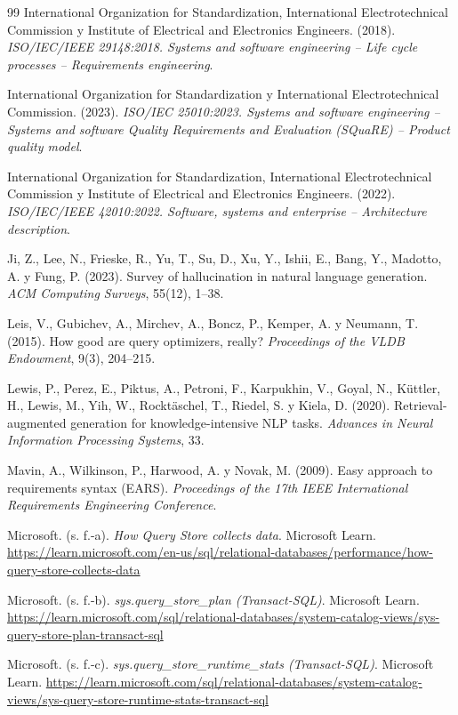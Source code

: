 \documentclass[12pt,a4paper]{article}
\begin{document}
\begin{thebibliography}{99}
 International Organization for Standardization, International Electrotechnical Commission y Institute of Electrical and Electronics Engineers. (2018). \textit{ISO/IEC/IEEE 29148:2018. Systems and software engineering -- Life cycle processes -- Requirements engineering}.

 International Organization for Standardization y International Electrotechnical Commission. (2023). \textit{ISO/IEC 25010:2023. Systems and software engineering -- Systems and software Quality Requirements and Evaluation (SQuaRE) -- Product quality model}.

 International Organization for Standardization, International Electrotechnical Commission y Institute of Electrical and Electronics Engineers. (2022). \textit{ISO/IEC/IEEE 42010:2022. Software, systems and enterprise -- Architecture description}.

 Ji, Z., Lee, N., Frieske, R., Yu, T., Su, D., Xu, Y., Ishii, E., Bang, Y., Madotto, A. y Fung, P. (2023). Survey of hallucination in natural language generation. \textit{ACM Computing Surveys}, 55(12), 1--38.

 Leis, V., Gubichev, A., Mirchev, A., Boncz, P., Kemper, A. y Neumann, T. (2015). How good are query optimizers, really? \textit{Proceedings of the VLDB Endowment}, 9(3), 204--215.

 Lewis, P., Perez, E., Piktus, A., Petroni, F., Karpukhin, V., Goyal, N., Küttler, H., Lewis, M., Yih, W., Rocktäschel, T., Riedel, S. y Kiela, D. (2020). Retrieval-augmented generation for knowledge-intensive NLP tasks. \textit{Advances in Neural Information Processing Systems}, 33.

 Mavin, A., Wilkinson, P., Harwood, A. y Novak, M. (2009). Easy approach to requirements syntax (EARS). \textit{Proceedings of the 17th IEEE International Requirements Engineering Conference}.

 Microsoft. (s. f.-a). \textit{How Query Store collects data}. Microsoft Learn. \url{https://learn.microsoft.com/en-us/sql/relational-databases/performance/how-query-store-collects-data}

 Microsoft. (s. f.-b). \textit{sys.query\_store\_plan (Transact-SQL)}. Microsoft Learn. \url{https://learn.microsoft.com/sql/relational-databases/system-catalog-views/sys-query-store-plan-transact-sql}

 Microsoft. (s. f.-c). \textit{sys.query\_store\_runtime\_stats (Transact-SQL)}. Microsoft Learn. \url{https://learn.microsoft.com/sql/relational-databases/system-catalog-views/sys-query-store-runtime-stats-transact-sql}


\end{thebibliography}
\end{document}
